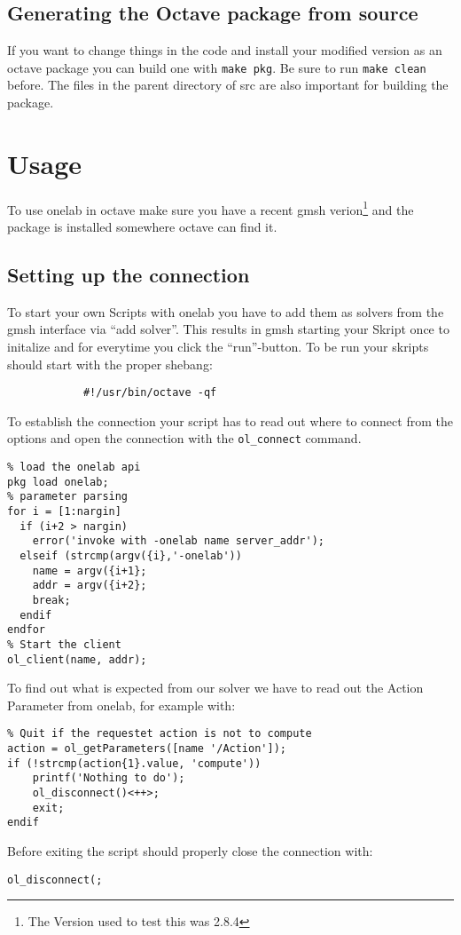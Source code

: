 \documentclass[article,english,colorback,accentcolor=tud9b,11pt]{tudreport}
\begin{document}
		\subsection{Generating the Octave package from source}
		If you want to change things in the code and install your modified version as an octave package you can build one with \texttt{make pkg}. Be sure to run \texttt{make clean} before. The files in the parent directory of src are also important for building the package.
		
		\section{Usage}
		To use onelab in octave make sure you have a recent gmsh verion\footnote{The Version used to test this was 2.8.4} and the package is installed somewhere octave can find it.
		\subsection{Setting up the connection}
		To start your own Scripts with onelab you have to add them as solvers from the gmsh interface via ``add solver''. This results in gmsh starting your Skript once to initalize and for everytime you click the ``run''-button. To be run your skripts should start with the proper shebang: 
		\begin{lstlisting} 
			#!/usr/bin/octave -qf
		\end{lstlisting}
		To establish the connection your script has to read out where to connect from the options and open the connection with the \texttt{ol\_connect} command.
		\begin{lstlisting} 
% load the onelab api
pkg load onelab;
% parameter parsing
for i = [1:nargin]
  if (i+2 > nargin)
    error('invoke with -onelab name server_addr');
  elseif (strcmp(argv({i},'-onelab'))
    name = argv({i+1};
    addr = argv({i+2};
    break;
  endif
endfor
% Start the client
ol_client(name, addr);
		\end{lstlisting}
		To find out what is expected from our solver we have to read out the Action Parameter from onelab, for example with:
		\begin{lstlisting} 
% Quit if the requestet action is not to compute
action = ol_getParameters([name '/Action']);
if (!strcmp(action{1}.value, 'compute'))
	printf('Nothing to do');
	ol_disconnect()<++>;
	exit;
endif
		\end{lstlisting}
		Before exiting the script should properly close the connection with:
		\begin{lstlisting} 
ol_disconnect(;
		\end{lstlisting}
\end{document}
